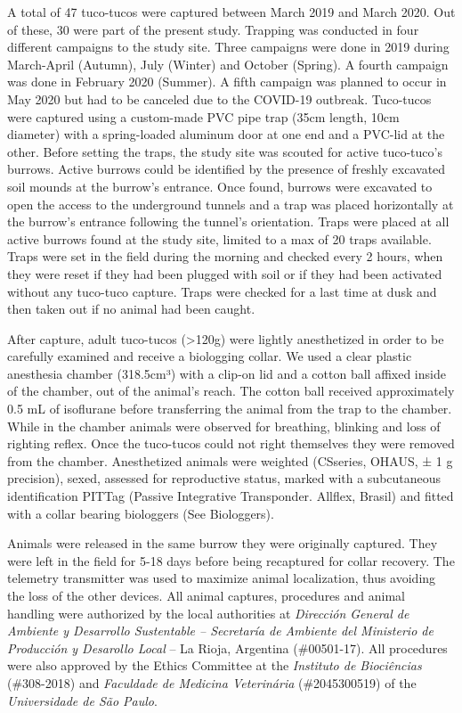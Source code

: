 \documentclass[english,msc,numbers,hidelinks]{coppe}
\begin{document}
  A total of 47 tuco-tucos were captured between March 2019 and March 2020. Out of these, 30 were part of the present study. Trapping was conducted in four different campaigns to the study site. Three campaigns were done in 2019 during March-April (Autumn), July (Winter) and October (Spring). A fourth campaign was done in February 2020 (Summer). A fifth campaign was planned to occur in May 2020 but had to be canceled due to the COVID-19 outbreak. Tuco-tucos were captured using a custom-made PVC pipe trap (35cm length, 10cm diameter) with a spring-loaded aluminum door at one end and a PVC-lid at the other. Before setting the traps, the study site was scouted for active tuco-tuco's burrows. Active burrows could be identified by the presence of freshly excavated soil mounds at the burrow's entrance. Once found, burrows were excavated to open the access to the underground tunnels and a trap was placed horizontally at the burrow's entrance following the tunnel's orientation. Traps were placed at all active burrows found at the study site, limited to a max of 20 traps available. Traps were set in the field during the morning and checked every 2 hours, when they were reset if they had been plugged with soil or if they had been activated without any tuco-tuco capture. Traps were checked for a last time at dusk and then taken out if no animal had been caught.

  After capture, adult tuco-tucos (\textgreater120g) were lightly anesthetized in order to be carefully examined and receive a biologging collar. We used a clear plastic anesthesia chamber (318.5cm³) with a clip-on lid and a cotton ball affixed inside of the chamber, out of the animal's reach. The cotton ball received approximately 0.5 mL of isoflurane before transferring the animal from the trap to the chamber. While in the chamber animals were observed for breathing, blinking and loss of righting reflex. Once the tuco-tucos could not right themselves they were removed from the chamber. Anesthetized animals were weighted (CSseries, OHAUS, ± 1 g precision), sexed, assessed for reproductive status, marked with a subcutaneous identification PITTag (Passive Integrative Transponder. Allflex, Brasil) and fitted with a collar bearing biologgers (See Biologgers).

  Animals were released in the same burrow they were originally captured. They were left in the field for 5-18 days before being recaptured for collar recovery. The telemetry transmitter was used to maximize animal localization, thus avoiding the loss of the other devices. All animal captures, procedures and animal handling were authorized by the local authorities at \emph{Dirección General de Ambiente y Desarrollo Sustentable -- Secretaría de Ambiente del Ministerio de Producción y Desarollo Local} -- La Rioja, Argentina (\#00501-17). All procedures were also approved by the Ethics Committee at the \emph{Instituto de Biociências} (\#308-2018) and \emph{Faculdade de Medicina Veterinária} (\#2045300519) of the \emph{Universidade de São Paulo}.
\end{document}
